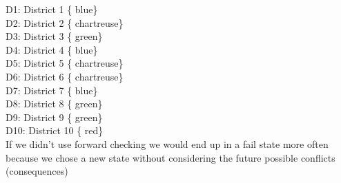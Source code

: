 \documentclass{article}
\begin{document}
D1: District 1 \left\{ {blue}\right\} \\
D2: District 2 \left\{ {chartreuse}\right\} \\
D3: District 3 \left\{ {green}\right\} \\
D4: District 4 \left\{ {blue}\right\} \\
D5: District 5 \left\{ {chartreuse}\right\} \\
D6: District 6 \left\{ {chartreuse}\right\} \\
D7: District 7 \left\{ {blue}\right\} \\
D8: District 8 \left\{ {green}\right\} \\
D9: District 9 \left\{ {green}\right\} \\
D10: District 10 \left\{ {red}\right\} \\

If we didn't use forward checking we would end up in a fail state more often because we
chose a new state without considering the future possible conflicts (consequences)
\end{document}

